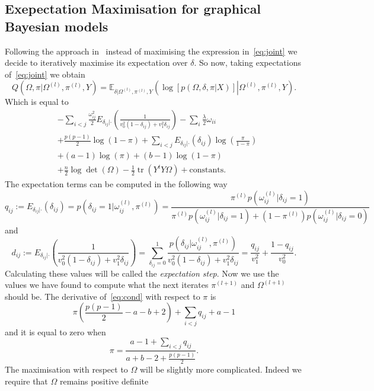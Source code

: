 \documentclass{scrartcl}
\DeclareMathOperator{\tr}{tr}
\newcommand{\powl}{^{(l)}}
\begin{document}
\subsection{Exepectation Maximisation for graphical Bayesian models}
Following the approach in~\cite{limcco-2017} instead of maximising the
expression in~\cref{eq:joint} we decide to iteratively maximise its expectation
over $\delta$. So now, taking expectations of~\cref{eq:joint} we obtain
\begin{equation}\label{eq:cond}
	Q(\Omega, \pi| \Omega\powl, \pi\powl, Y) = \mathbb{E}_{\delta|\Omega\powl, \pi\powl, Y}\left(\log[p(\Omega, \delta, \pi| X)]\left|  \Omega\powl, \pi\powl, Y\right.\right).
\end{equation}
Which is equal to
\begin{align*}
	 & - \sum_{i<j} \frac{\omega_{ij}^2}{2} E_{\delta_{ij} |
			\cdot}\left(\frac{1}{v_0^2 (1 - \delta_{ij}) + v_1^2 \delta_{ij}}\right) -
	\sum_i \frac{\lambda}{2} \omega_{ii}
	\\
	 & + \frac{p(p-1)}{2}  \log(1 - \pi) + \sum_{i<j} E_{\delta_{ij} |
			\cdot}(\delta_{ij}) \log\left(\frac{\pi}{1-\pi}\right)
	\\
	 & + (a - 1) \log(\pi) + (b - 1) \log(1 - \pi)
	\\
	 & + \frac{n}{2} \log\det(\Omega) - \frac{1}{2} \tr(Y^t Y \Omega) +
	\text{constants.}
\end{align*}
The expectation terms can be computed in the following way
\[q_{ij} := E_{\delta_{ij} | \cdot}(\delta_{ij}) = p(\delta_{ij} = 1 | \omega_{ij}\powl, \pi\powl)
	= \frac{ \pi\powl p(\omega_{ij}\powl | \delta_{ij} = 1)}{\pi\powl p(\omega_{ij}\powl | \delta_{ij} = 1) +
		(1 - \pi\powl) p(\omega_{ij}\powl | \delta_{ij} = 0)}\]
and
\[
	d_{ij} := E_{\delta_{ij} | \cdot}\left(\frac{1}{v_0^2 (1 -
			\delta_{ij}) + v_1^2 \delta_{ij}}\right) = \sum_{\delta_{ij} = 0}^1
	\frac{p(\delta_{ij} | \omega_{ij}\powl, \pi\powl)}{v_0^2 (1 - \delta_{ij}) +
		v_1^2 \delta_{ij}} = \frac{q_{ij}}{v_1^2} + \frac{1 - q_{ij}}{v_0^2}.
\]
Calculating these values will be called the \emph{expectation step}.
Now we use the values we have found to compute what the next iterates $\pi^{(l+1)}$ and $\Omega^{(l+1)}$ should be.
The derivative of~\cref{eq:cond} with respect to $\pi$ is
\[\pi\left(\frac{p(p-1)}{2} - a - b + 2\right) + \sum_{i<j} q_{ij} + a - 1\]
and it is equal to zero when \[\pi = \frac{a-1 + \sum_{i<j}q_{ij}}{a + b - 2 +
	\frac{p(p-1)}{2}}.\]
The maximisation with respect to $\Omega$ will be slightly more
complicated. Indeed we require that $\Omega$ remains positive definite
\end{document}
